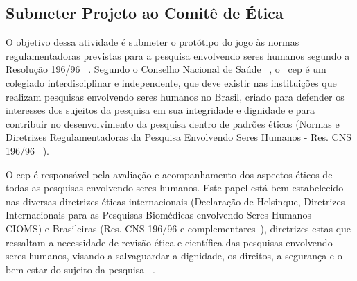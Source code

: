 %

\subsection{Submeter Projeto ao Comitê de Ética}
O objetivo dessa atividade é submeter o protótipo do jogo às normas regulamentadoras previstas para a pesquisa envolvendo seres humanos segundo a Resolução 196/96 ~\cite{conselho2000normas}. Segundo o Conselho Nacional de Saúde ~\cite{conep2002}, o ~\ac{cep} é um colegiado interdisciplinar e independente,  que deve existir nas instituições que realizam pesquisas envolvendo seres humanos no Brasil, criado para defender os interesses dos sujeitos da pesquisa em sua integridade e dignidade e para contribuir no desenvolvimento da pesquisa dentro de padrões éticos (Normas e Diretrizes Regulamentadoras da Pesquisa Envolvendo Seres Humanos - Res. CNS 196/96 ~\cite{conselho2000normas}). 

O \ac{cep} é responsável pela avaliação e acompanhamento dos aspectos éticos de todas as pesquisas envolvendo seres humanos. Este papel está bem estabelecido nas diversas diretrizes éticas internacionais (Declaração de Helsinque, Diretrizes Internacionais para as Pesquisas Biomédicas envolvendo Seres Humanos – CIOMS) e Brasileiras (Res. CNS 196/96 e complementares~\cite{conselho2000normas}), diretrizes estas que ressaltam a necessidade de revisão ética e científica das pesquisas envolvendo seres humanos, visando a salvaguardar a dignidade, os direitos, a segurança e o bem-estar do sujeito da pesquisa ~\cite{conep2002}.
%

